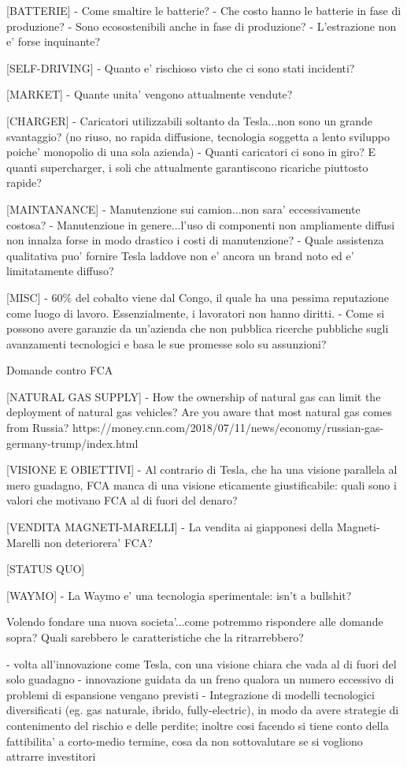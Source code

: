 [BATTERIE]
    - Come smaltire le batterie?
    - Che costo hanno le batterie in fase di produzione? 
    - Sono ecosostenibili anche in fase di produzione?
    - L'estrazione non e' forse inquinante?

[SELF-DRIVING]
    - Quanto e' rischioso visto che ci sono stati incidenti?
    
[MARKET]
    - Quante unita' vengono attualmente vendute?
    
[CHARGER]
    - Caricatori utilizzabili soltanto da Tesla...non sono un grande svantaggio? (no riuso, no rapida diffusione, tecnologia soggetta a lento sviluppo poiche' monopolio di una sola azienda)
    - Quanti caricatori ci sono in giro? E quanti supercharger, i soli che attualmente garantiscono ricariche piuttosto rapide?
    
[MAINTANANCE]
    - Manutenzione sui camion...non sara' eccessivamente costosa?
    - Manutenzione in genere...l'uso di componenti non ampliamente diffusi non innalza forse in modo drastico i costi di manutenzione?
    - Quale assistenza qualitativa puo' fornire Tesla laddove non e' ancora un brand noto ed e' limitatamente diffuso?
    
[MISC]
    - 60\% del cobalto viene dal Congo, il quale ha una pessima reputazione come luogo di lavoro. Essenzialmente, i lavoratori non hanno diritti.
    - Come si possono avere garanzie da un'azienda che non pubblica ricerche pubbliche sugli avanzamenti tecnologici e basa le sue promesse solo su assunzioni?
  
  
  
    
Domande contro FCA
    
[NATURAL GAS SUPPLY]
    - How the ownership of natural gas can limit the deployment of natural gas vehicles? Are you aware that most natural gas comes from Russia?                 https://money.cnn.com/2018/07/11/news/economy/russian-gas-germany-trump/index.html
    
[VISIONE E OBIETTIVI]
    - Al contrario di Tesla, che ha una visione parallela al mero guadagno, FCA manca di una visione eticamente giustificabile: quali sono i valori che motivano FCA al di fuori del denaro?
    
[VENDITA MAGNETI-MARELLI]
    - La vendita ai giapponesi della Magneti-Marelli non deteriorera' FCA?
    
[STATUS QUO]

[WAYMO]
    - La Waymo e' una tecnologia sperimentale: isn't a bullshit?
    
    
    
Volendo fondare una nuova societa'...come potremmo rispondere alle domande sopra? Quali sarebbero le caratteristiche che la ritrarrebbero?

    - volta all'innovazione come Tesla, con una visione chiara che vada al di fuori del solo guadagno
    - innovazione guidata da un freno qualora un numero eccessivo di problemi di espansione vengano previsti
    - Integrazione di modelli tecnologici diversificati (eg. gas naturale, ibrido, fully-electric), in modo da avere strategie di contenimento del rischio e delle perdite; inoltre cosi facendo si tiene conto della fattibilita' a corto-medio termine, cosa da non sottovalutare se si vogliono attrarre investitori